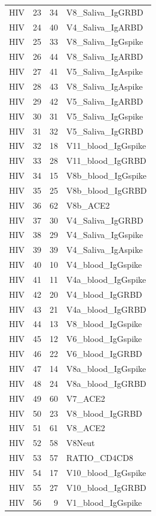 \begin{longtable}{lrrp{}}
HIV & 23 & 34 & V8\_Saliva\_IgGRBD \\
HIV & 24 & 40 & V4\_Saliva\_IgARBD \\
HIV & 25 & 33 & V8\_Saliva\_IgGspike \\
HIV & 26 & 44 & V8\_Saliva\_IgARBD \\
HIV & 27 & 41 & V5\_Saliva\_IgAspike \\
HIV & 28 & 43 & V8\_Saliva\_IgAspike \\
HIV & 29 & 42 & V5\_Saliva\_IgARBD \\
HIV & 30 & 31 & V5\_Saliva\_IgGspike \\
HIV & 31 & 32 & V5\_Saliva\_IgGRBD \\
HIV & 32 & 18 & V11\_blood\_IgGspike \\
HIV & 33 & 28 & V11\_blood\_IgGRBD \\
HIV & 34 & 15 & V8b\_blood\_IgGspike \\
HIV & 35 & 25 & V8b\_blood\_IgGRBD \\
HIV & 36 & 62 & V8b\_ACE2 \\
HIV & 37 & 30 & V4\_Saliva\_IgGRBD \\
HIV & 38 & 29 & V4\_Saliva\_IgGspike \\
HIV & 39 & 39 & V4\_Saliva\_IgAspike \\
HIV & 40 & 10 & V4\_blood\_IgGspike \\
HIV & 41 & 11 & V4a\_blood\_IgGspike \\
HIV & 42 & 20 & V4\_blood\_IgGRBD \\
HIV & 43 & 21 & V4a\_blood\_IgGRBD \\
HIV & 44 & 13 & V8\_blood\_IgGspike \\
HIV & 45 & 12 & V6\_blood\_IgGspike \\
HIV & 46 & 22 & V6\_blood\_IgGRBD \\
HIV & 47 & 14 & V8a\_blood\_IgGspike \\
HIV & 48 & 24 & V8a\_blood\_IgGRBD \\
HIV & 49 & 60 & V7\_ACE2 \\
HIV & 50 & 23 & V8\_blood\_IgGRBD \\
HIV & 51 & 61 & V8\_ACE2 \\
HIV & 52 & 58 & V8Neut \\
HIV & 53 & 57 & RATIO\_CD4CD8 \\
HIV & 54 & 17 & V10\_blood\_IgGspike \\
HIV & 55 & 27 & V10\_blood\_IgGRBD \\
HIV & 56 & 9 & V1\_blood\_IgGspike \\

\end{longtable}
